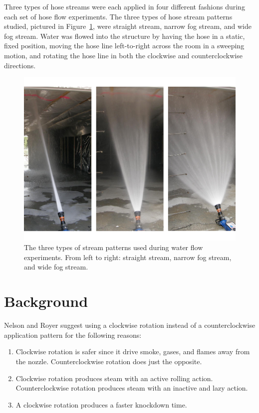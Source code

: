 \documentclass[12pt,oneside]{book}
\begin{document}
Three types of hose streams were each applied in four different fashions during each set of hose flow experiments. The three types of hose stream patterns studied, pictured in Figure~\ref{fig:hose_streams}, were straight stream, narrow fog stream, and wide fog stream. Water was flowed into the structure by having the hose in a static, fixed position, moving the hose line left-to-right across the room in a sweeping motion, and rotating the hose line in both the clockwise and counterclockwise directions.

\begin{figure}[!ht]
\includegraphics[width=6in]{../Pictures/hose_streams.pdf}
\caption[Different Hose Stream Patterns]{The three types of stream patterns used during water flow experiments. From left to right: straight stream, narrow fog stream, and wide fog stream.}
\label{fig:hose_streams}
\end{figure}
\FloatBarrier

\section{Background}
\label{sec:background}
Nelson and Royer suggest using a clockwise rotation instead of a counterclockwise application pattern for the following reasons:
\begin{enumerate} 
\item Clockwise rotation is safer since it drive smoke, gases, and flames away from the nozzle.
Counterclockwise rotation does just the opposite.
\item Clockwise rotation produces steam with an active rolling action. Counterclockwise rotation
produces steam with an inactive and lazy action.
\item A clockwise rotation produces a faster knockdown time.
\end{enumerate}
\end{document}
